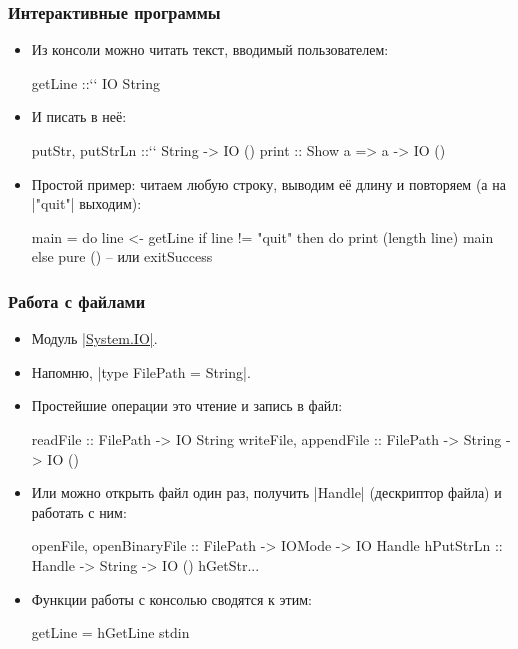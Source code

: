 \documentclass[11pt]{beamer}
\begin{document}
\begin{frame}[fragile]
  \frametitle{Интерактивные программы}
  \begin{itemize}
    \item Из консоли можно читать текст, вводимый пользователем:
          \begin{haskell}
    getLine ::`\pause` IO String
    \end{haskell}
    \item И писать в неё:
          \begin{haskell}
    putStr, putStrLn ::`\pause` String -> IO ()
    print :: Show a => a -> IO () 
    \end{haskell}
          \pause
    \item Простой пример: читаем любую строку, выводим её длину и повторяем (а на \haskinline|"quit"| выходим):
          \pause
          \begin{haskell}
    main = do
      line <- getLine
      if line != "quit"
        then do
          print (length line)
          main
        else
          pure ()  -- или exitSuccess
    \end{haskell}
  \end{itemize}
\end{frame}

\begin{frame}[fragile]
  \frametitle{Работа с файлами}
  \begin{itemize}
    \item Модуль \href{http://hackage.haskell.org/package/base-4.12.0.0/docs/System-IO.html}{\haskinline|System.IO|}.
    \item Напомню, \haskinline|type FilePath = String|.
    \item Простейшие операции это чтение и запись в файл:
          \begin{haskell}
    readFile :: FilePath -> IO String
    writeFile, appendFile :: 
      FilePath -> String -> IO ()
    \end{haskell}
    \item
          Или можно открыть файл один раз, получить \haskinline|Handle| (дескриптор файла) и работать с ним:
          \begin{haskell}
    openFile, openBinaryFile :: 
      FilePath -> IOMode -> IO Handle 
    hPutStrLn :: Handle -> String -> IO ()
    hGetStr...
    \end{haskell}
          \pause
    \item
          Функции работы с консолью сводятся к этим:
          \begin{haskell}
    getLine = hGetLine stdin
    \end{haskell}
  \end{itemize}
\end{frame}
\end{document}
